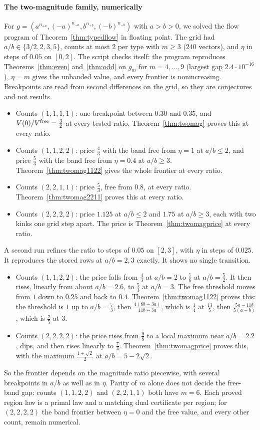\paragraph{The two-magnitude family, numerically}
For $g=(a^{n_{+a}},(-a)^{n_{-a}},b^{n_{+b}},(-b)^{n_{-b}})$ with $a>b>0$, we solved the flow
program of Theorem~\ref{thm:typedflow} in floating point. The grid had $a/b\in\{3/2,2,3,5\}$,
counts at most $2$ per type with $m\ge3$ ($240$ vectors), and $\eta$ in steps of $0.05$ on
$[0,2]$. The script checks itself: the program reproduces Theorems~\ref{thm:even}
and~\ref{thm:odd} on $g_m$ for $m=4,\dots,9$ (largest gap $2.4\cdot10^{-16}$), $\eta=m$ gives the
unbanded value, and every frontier is nonincreasing. Breakpoints are read from second
differences on the grid, so they are conjectures and not results. \NUM{}
\begin{itemize}
\item Counts $(1,1,1,1)$: one breakpoint between $0.30$ and $0.35$, and
$V(0)/V^{\rm free}=\frac32$ at every tested ratio. Theorem~\ref{thm:twomag} proves this at
every ratio.
\item Counts $(1,1,2,2)$: price $\frac43$ with the band free from $\eta=1$ at $a/b\le2$, and
price $\frac53$ with the band free from $\eta=0.4$ at $a/b\ge3$. Theorem~\ref{thm:twomag1122} gives
the whole frontier at every ratio.
\item Counts $(2,2,1,1)$: price $\frac53$, free from $0.8$, at every ratio.
Theorem~\ref{thm:twomag2211} proves this at every ratio.
\item Counts $(2,2,2,2)$: price $1.125$ at $a/b\le2$ and $1.75$ at $a/b\ge3$, each with two
kinks one grid step apart. The price is Theorem~\ref{thm:twomagprice} at every ratio.
\end{itemize}
A second run refines the ratio to steps of $0.05$ on $[2,3]$, with $\eta$ in steps of
$0.025$. It reproduces the stored rows at $a/b=2,3$ exactly. It shows no single transition.
\NUM{}
\begin{itemize}
\item Counts $(1,1,2,2)$: the price falls from $\frac43$ at $a/b=2$ to $\frac76$ at $a/b=\frac52$.
It then rises, linearly from about $a/b=2.6$, to $\frac53$ at $a/b=3$. The free threshold moves
from $1$ down to $0.25$ and back to $0.4$. Theorem~\ref{thm:twomag1122} proves this: the threshold
is $1$ up to $a/b=\frac73$, then $\frac{4(8b-3a)}{11b-3a}$, which is $\frac14$ at $\frac{13}5$, then
$\frac{5a-11b}{5(a-b)}$, which is $\frac25$ at $3$.
\item Counts $(2,2,2,2)$: the price rises from $\frac98$ to a local maximum near $a/b=2.2$,
dips, and then rises linearly to $\frac74$. Theorem~\ref{thm:twomagprice} proves this, with the
maximum $\frac{1+\sqrt2}2$ at $a/b=5-2\sqrt2$.
\end{itemize}
So the frontier depends on the magnitude ratio piecewise, with several breakpoints in $a/b$ as
well as in $\eta$. Parity of $m$ alone does not decide the free-band gap: counts $(1,1,2,2)$ and
$(2,2,1,1)$ both have $m=6$. Each proved region law is a primal law and a matching dual
certificate per region; for $(2,2,2,2)$ the band frontier between $\eta=0$ and the free value,
and every other count, remain numerical.

